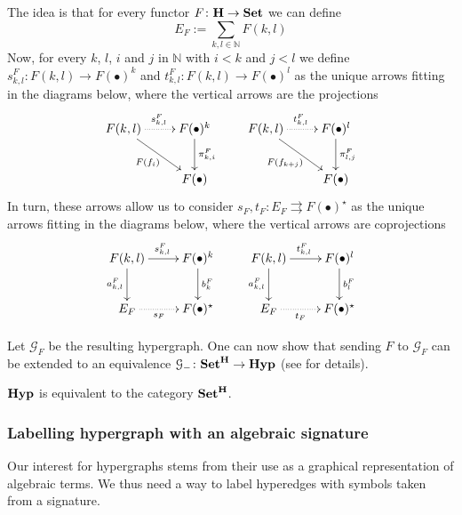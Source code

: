 \documentclass[a4paper,UKenglish,cleveref,pdftex,thm-restate,numberwithinsect]{lipics-v2021}
\newcommand{\Set}{\mathbf{Set}}
\newcommand{\catname}[1]{\textbf{\textup{#1}}}
\newcommand{\hyp}{\catname{Hyp}}
\begin{document}
The idea is that for every functor $F\colon \catname{H}\to \catname{Set}$ we can define
\[E_F:=\sum_{k,l\in \mathbb{N}}F(k,l)\]
%
Now, for every $k$, $l$, $i$ and $j$ in $\mathbb{N}$ with $i< k$ and $j< l$ we define $s^F_{k,l}\colon F(k,l)\to F(\bullet)^k$ and  $t^F_{k,l}\colon F(k,l)\to F(\bullet)^l$ as the unique arrows fitting in the diagrams below, where the vertical arrows are the projections
\[\xymatrix{F(k,l)  \ar@{.>}[r]^{s^F_{k,l}} \ar[dr]_{F(f_i)}& F(\bullet)^{k} \ar[d]^{\pi^F_{k,i}} & F(k,l) \ar@{.>}[r]^{t^F_{k,l}} \ar[dr]_{F(f_{k+j})} & F(\bullet)^{l} \ar[d]^{\pi^F_{l,j}} \\ & F(\bullet) && F(\bullet)}\]
%
In turn, these arrows allow us to consider
$s_F, t_F\colon E_F\rightrightarrows F(\bullet)^{\star}$ as the unique arrows fitting in the diagrams below, where the vertical arrows are coprojections
\[\xymatrix{F(k,l) \ar[d]_{a^F_{k,l}}  \ar[r]^{s^{F}_{k,l}}& F(\bullet)^{k} \ar[d]^{b^F_{k}} & F(k,l) \ar[d]_{a^F_{k,l}}  \ar[r]^{t^{F}_{k,l}}& F(\bullet)^{l} \ar[d]^{b^F_{l}}\\ E_F \ar@{.>}[r]_-{s_F}& F(\bullet)^\star & E_F \ar@{.>}[r]_-{t_F}& F(\bullet)^\star}\]

Let $\mathcal{G}_F$ be the resulting hypergraph. One can now show that  sending $F$ to $\mathcal{G}_F$ can be extended to an equivalence $\mathcal{G}_{-}\colon \Set^{\catname{H}}\to \hyp$ (see \cite{castelnovo2023thesis,CastelnovoGM24} for details).


\begin{proposition}
	$\hyp$ is equivalent to the category $\Set^{\catname{H}}$.
\end{proposition}
\fi

\subsubsection{Labelling hypergraph with an algebraic signature}\label{sssect:hyp_alg_sign}

Our interest for hypergraphs stems from their use as a graphical representation of algebraic terms. We thus need a way to label hyperedges with symbols taken from a signature.
\end{document}
